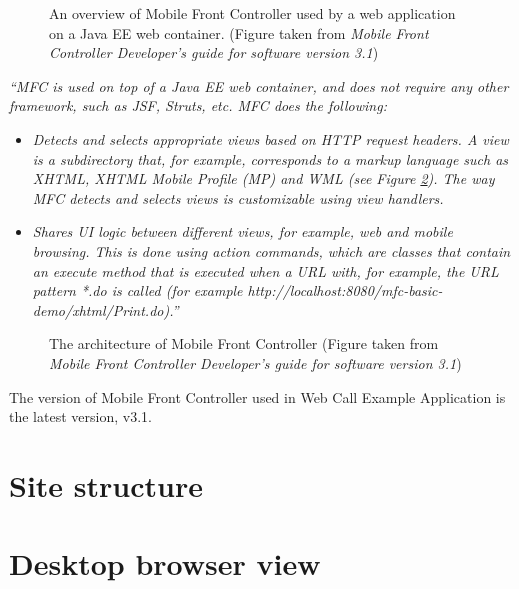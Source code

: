 \begin{figure}[!hbtp]
\centering
{}
\caption{An overview of Mobile Front Controller used by a web application on a
Java EE web container. (Figure taken from \textit{Mobile Front Controller Developer's guide for software version 3.1}\cite{DevelopersGuideOfMFC})}
\label{fig:MFCOverview}
\end{figure} 

\textit{``MFC is used on top of a Java EE web container, and does not require any other framework, such as JSF, Struts, etc.
MFC does the following:}
\begin{itemize}
\item \textit{{Detects and selects appropriate views based on HTTP request headers. A view is a subdirectory that, for example, corresponds to a markup language such as XHTML, XHTML Mobile Profile (MP) and WML (see Figure \ref{fig:ArchitecureOfMFC}). The way MFC detects and selects views is customizable using view handlers.} }
\item \textit{Shares UI logic between different views, for example, web and mobile browsing. This is done using action commands, which are classes that contain an execute method that is executed when a URL with, for example, the URL pattern *.do is called (for example http://localhost:8080/mfc-basic-demo/xhtml/Print.do).''}\cite{DevelopersGuideOfMFC}
\end{itemize}

\begin{figure}[!hbtp]
\centering
{}
\caption{The architecture of Mobile Front Controller (Figure taken from \textit{Mobile Front Controller Developer's guide for software version 3.1}\cite{DevelopersGuideOfMFC})}
\label{fig:ArchitecureOfMFC}
\end{figure} 

The version of Mobile Front Controller used in Web Call Example Application is the latest version, v3.1.

\section{Site structure}
\label{sec:WebApplication:SiteStructure}

\section{Desktop browser view}
\label{sec:WebApplication:DesktopBrowserView}

